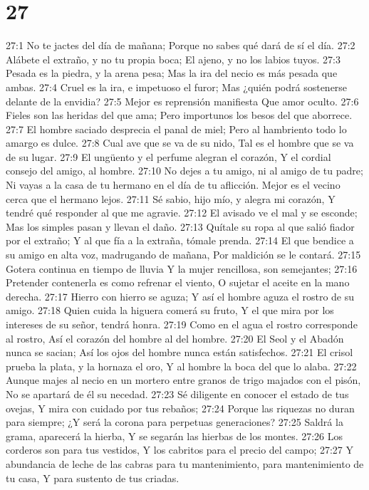 \chapter{27}


27:1 No te jactes del día de mañana;  
Porque no sabes qué dará de sí el día. 
27:2 Alábete el extraño, y no tu propia boca;  
El ajeno, y no los labios tuyos.  
27:3 Pesada es la piedra, y la arena pesa;  
Mas la ira del necio es más pesada que ambas.  
27:4 Cruel es la ira, e impetuoso el furor;  
Mas ¿quién podrá sostenerse delante de la envidia?  
27:5 Mejor es reprensión manifiesta  
Que amor oculto.  
27:6 Fieles son las heridas del que ama;  
Pero importunos los besos del que aborrece.  
27:7 El hombre saciado desprecia el panal de miel;  
Pero al hambriento todo lo amargo es dulce.  
27:8 Cual ave que se va de su nido,  
Tal es el hombre que se va de su lugar.  
27:9 El ungüento y el perfume alegran el corazón,  
Y el cordial consejo del amigo, al hombre.  
27:10 No dejes a tu amigo, ni al amigo de tu padre;  
Ni vayas a la casa de tu hermano en el día de tu aflicción.  
Mejor es el vecino cerca que el hermano lejos.  
27:11 Sé sabio, hijo mío, y alegra mi corazón,  
Y tendré qué responder al que me agravie.  
27:12 El avisado ve el mal y se esconde;  
Mas los simples pasan y llevan el daño.  
27:13 Quítale su ropa al que salió fiador por el extraño;  
Y al que fía a la extraña, tómale prenda.  
27:14 El que bendice a su amigo en alta voz, madrugando de mañana,  
Por maldición se le contará.  
27:15 Gotera continua en tiempo de lluvia  
Y la mujer rencillosa, son semejantes;  
27:16 Pretender contenerla es como refrenar el viento,  
O sujetar el aceite en la mano derecha.  
27:17 Hierro con hierro se aguza;  
Y así el hombre aguza el rostro de su amigo.  
27:18 Quien cuida la higuera comerá su fruto,  
Y el que mira por los intereses de su señor, tendrá honra.  
27:19 Como en el agua el rostro corresponde al rostro,  
Así el corazón del hombre al del hombre.  
27:20 El Seol y el Abadón nunca se sacian;  
Así los ojos del hombre nunca están satisfechos.  
27:21 El crisol prueba la plata, y la hornaza el oro,  
Y al hombre la boca del que lo alaba. 
27:22 Aunque majes al necio en un mortero entre granos de trigo majados con el pisón,  
No se apartará de él su necedad.  
27:23 Sé diligente en conocer el estado de tus ovejas,  
Y mira con cuidado por tus rebaños;  
27:24 Porque las riquezas no duran para siempre;  
¿Y será la corona para perpetuas generaciones?  
27:25 Saldrá la grama, aparecerá la hierba,  
Y se segarán las hierbas de los montes.  
27:26 Los corderos son para tus vestidos,  
Y los cabritos para el precio del campo;  
27:27 Y abundancia de leche de las cabras para tu mantenimiento, para mantenimiento de tu casa,  
Y para sustento de tus criadas.  

